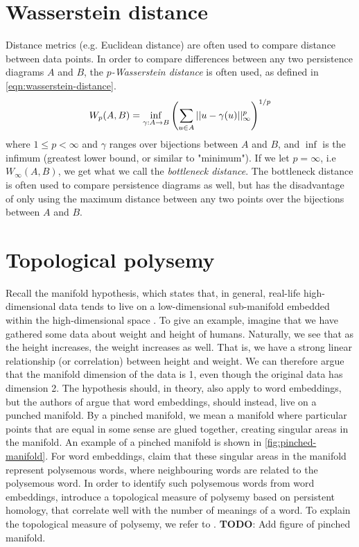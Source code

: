 \section{Wasserstein distance}
\label{sec:wasserstein-distance}
Distance metrics (e.g. Euclidean distance) are often used to compare distance between data points. In order to compare differences between any two persistence diagrams $A$ and $B$, the $p$\textit{-Wasserstein distance} is often used, as defined in \cref{eqn:wasserstein-distance}.
\begin{align}
    W_p(A, B) = \inf_{\gamma: A \rightarrow B} \left(\sum\limits_{u \in A}^{} ||u - \gamma(u)||_{\infty}^{p}\right)^{1/p}
    \label{eqn:wasserstein-distance}
\end{align}
where $1 \leq p < \infty$ and $\gamma$ ranges over bijections between $A$ and $B$, and $\inf$ is the infimum (greatest lower bound, or similar to "minimum"). If we let $p=\infty$, i.e $W_\infty(A, B)$, we get what we call the \textit{bottleneck distance}. The bottleneck distance is often used to compare persistence diagrams as well, but has the disadvantage of only using the maximum distance between any two points over the bijections between $A$ and $B$.

\section{Topological polysemy}
\label{sec:topological-polysemy}
Recall the manifold hypothesis, which states that, in general, real-life high-dimensional data tends to live on a low-dimensional sub-manifold embedded within the high-dimensional space \cite[p. 16]{bengio2014representation}. To give an example, imagine that we have gathered some data about weight and height of humans. Naturally, we see that as the height increases, the weight increases as well. That is, we have a strong linear relationship (or correlation) between height and weight. We can therefore argue that the manifold dimension of the data is 1, even though the original data has dimension 2. The hypothesis should, in theory, also apply to word embeddings, but the authors of \cite{jakubowski2020topology} argue that word embeddings, should instead, live on a punched manifold. By a pinched manifold, we mean a manifold where particular points that are equal in some sense are glued together, creating singular areas in the manifold. An example of a pinched manifold is shown in \cref{fig:pinched-manifold}. For word embeddings, \cite{jakubowski2020topology} claim that these singular areas in the manifold represent polysemous words, where neighbouring words are related to the polysemous word. In order to identify such polysemous words from word embeddings, \cite{jakubowski2020topology} introduce a topological measure of polysemy based on persistent homology, that correlate well with the number of meanings of a word. To explain the topological measure of polysemy, we refer to \cite{jakubowski2020topology}.
\textbf{TODO}: Add figure of pinched manifold.

